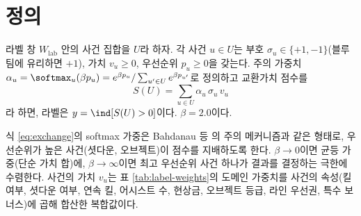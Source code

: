 
\section{정의}
\label{sec:label-definition}

\begin{definition}[교환가치 라벨]
\label{def:label}
라벨 창 $W_{\mathrm{lab}}$ 안의 사건 집합을 $U$라 하자. 각 사건 $u \in U$는 부호 $\sigma_u \in \{+1, -1\}$(블루 팀에 유리하면 $+1$), 가치 $v_u \ge 0$, 우선순위 $p_u \ge 0$을 갖는다. 주의 가중치 $\alpha_u = \softmax_u(\beta p_u) = e^{\beta p_u}/\sum_{u'\in U} e^{\beta p_{u'}}$로 정의하고 교환가치 점수를
\begin{equation}
  S(U) = \sum_{u \in U} \alpha_u\, \sigma_u\, v_u
  \label{eq:exchange}
\end{equation}
라 하면, 라벨은 $y = \ind[S(U) > 0]$이다. $\beta = 2.0$이다.
\end{definition}

식 \eqref{eq:exchange}의 softmax 가중은 Bahdanau 등 \cite{bahdanau2015neural}의 주의 메커니즘과 같은 형태로, 우선순위가 높은 사건(셧다운, 오브젝트)이 점수를 지배하도록 한다. $\beta \to 0$이면 균등 가중(단순 가치 합)에, $\beta \to \infty$이면 최고 우선순위 사건 하나가 결과를 결정하는 극한에 수렴한다. 사건의 가치 $v_u$는 표 \ref{tab:label-weights}의 도메인 가중치를 사건의 속성(킬 여부, 셧다운 여부, 연속 킬, 어시스트 수, 현상금, 오브젝트 등급, 라인 우선권, 특수 보너스)에 곱해 합산한 복합값이다.


